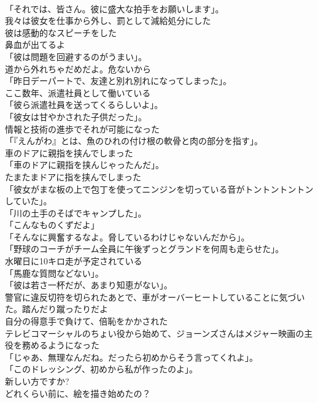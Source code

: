 \documentclass[8pt]{extreport}
\begin{document}
\begin{CJK}{UTF8}{min}
\\	「それでは、皆さん。彼に盛大な拍手をお願いします」。	
\\	我々は彼女を仕事から外し、罰として減給処分にした	
\\	彼は感動的なスピーチをした	
\\	鼻血が出てるよ	
\\	「彼は問題を回避するのがうまい」。	
\\	道から外れちゃだめだよ。危ないから	
\\	「昨日デーパートで、友達と別れ別れになってしまった」。	
\\	ここ数年、派遣社員として働いている	
\\	「彼ら派遣社員を送ってくるらしいよ」。	
\\	「彼女は甘やかされた子供だった」。	
\\	情報と技術の進歩でそれが可能になった	
\\	「『えんがわ』とは、魚のひれの付け根の軟骨と肉の部分を指す」。	
\\	車のドアに親指を挟んでしまった	
\\	「車のドアに親指を挟んじゃったんだ」。	
\\	たまたまドアに指を挟んでしまった	
\\	「彼女がまな板の上で包丁を使ってニンジンを切っている音がトントントントンしていた」。	
\\	「川の土手のそばでキャンプした」。	
\\	「こんなものくずだよ」	
\\	「そんなに興奮するなよ。脅しているわけじゃないんだから」。	
\\	「野球のコーチがチーム全員に午後ずっとグランドを何周も走らせた」。	
\\	水曜日に10キロ走が予定されている	
\\	「馬鹿な質問などない」。	
\\	「彼は若さ一杯だが、あまり知恵がない」。	
\\	警官に違反切符を切られたあとで、車がオーバーヒートしていることに気づいた。踏んだり蹴ったりだよ	
\\	自分の得意手で負けて、倍恥をかかされた	
\\	テレビコマーシャルのちょい役から始めて、ジョーンズさんはメジャー映画の主役を務めるようになった	
\\	「じゃあ、無理なんだね。だったら初めからそう言ってくれよ」。	
\\	「このドレッシング、初めから私が作ったのよ」。	
\\	新しい方ですか?	
\\	どれくらい前に、絵を描き始めたの？	

\end{CJK}
\end{document}
